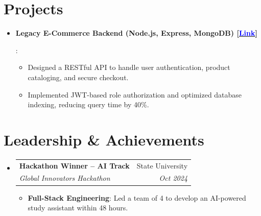 \documentclass[a4paper,11pt]{article}
\makeatletter
\newcommand{\resumeItem}[2]{
  \item\small{
    \textbf{#1}{: #2 \vspace{-2pt}}
  }
}
\newcommand{\resumeSubheading}[4]{
  \vspace{-1pt}\item
    \begin{tabular*}{0.97\textwidth}{l@{\extracolsep{\fill}}r}
      \textbf{#1} & #2 \\
      \textit{#3} & \textit{#4} \\
    \end{tabular*}\vspace{-5pt}
}
\newcommand{\resumeSubItem}[2]{\resumeItem{#1}{#2}\vspace{-3pt}}
\newcommand{\resumeSubHeadingListStart}{\begin{itemize}[leftmargin=0.15in, label={}, itemsep=0pt]}
\newcommand{\resumeSubHeadingListEnd}{\end{itemize}}
\newcommand{\resumeItemListStart}{\begin{itemize}[itemsep=0pt]}
\newcommand{\resumeItemListEnd}{\end{itemize}\vspace{-5pt}}
\makeatother
\begin{document}
\section{Projects}
\resumeSubHeadingListStart


\resumeSubItem{Legacy E-Commerce Backend (Node.js, Express, MongoDB) [\href{https://github.com/johndoe/legacy-backend}{\textcolor{blue}{Link}}]}
  {\vspace{-8pt}
  \begin{itemize}\itemsep0em \parskip0em
    \item Designed a RESTful API to handle user authentication, product cataloging, and secure checkout.
    \item Implemented JWT-based role authorization and optimized database indexing, reducing query time by 40\%.
  \end{itemize}}\vspace{-1em}


\resumeSubHeadingListEnd

\vspace{-3pt}
\section{Leadership \& Achievements}
  \resumeSubHeadingListStart
    \resumeSubheading
      {Hackathon Winner -- AI Track}{State University}
      {Global Innovators Hackathon}{Oct 2024}
      \resumeItemListStart\vspace{-3pt}
        \resumeItem{Full-Stack Engineering}
          {Led a team of 4 to develop an AI-powered study assistant within 48 hours.}
      \resumeItemListEnd
  \resumeSubHeadingListEnd
\end{document}
